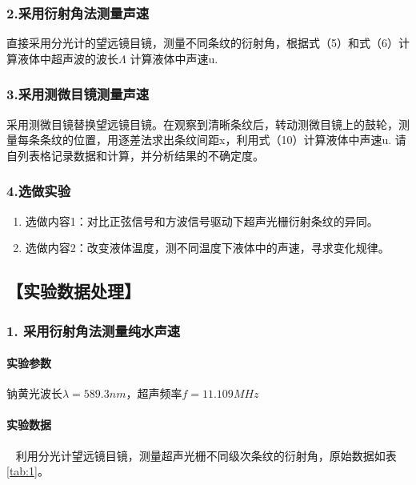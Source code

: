 \documentclass[12pt,a4paper,UTF8]{ctexart}
\begin{document}
\subsubsection*{2.采用衍射角法测量声速}

直接采用分光计的望远镜目镜，测量不同条纹的衍射角，根据式（5）和式（6）计算液体中超声波的波长$\varLambda$ 计算液体中声速u.
\subsubsection*{3.采用测微目镜测量声速}

采用测微目镜替换望远镜目镜。在观察到清晰条纹后，转动测微目镜上的鼓轮，测量每条条纹的位置，用逐差法求出条纹间距x，利用式（10）计算液体中声速u.
请自列表格记录数据和计算，并分析结果的不确定度。

\subsubsection*{4.选做实验}
    \begin{enumerate}
		\item 选做内容1：对比正弦信号和方波信号驱动下超声光栅衍射条纹的异同。
		\item 选做内容2：改变液体温度，测不同温度下液体中的声速，寻求变化规律。		
	\end{enumerate}

\subsection*{【实验数据处理】}

\subsubsection*{1. 采用衍射角法测量纯水声速}
		\paragraph{实验参数} 钠黄光波长$\lambda = 589.3 nm$，超声频率$f = 11.109 MHz$
		\paragraph{实验数据}~
		\newline
		\indent
		利用分光计望远镜目镜，测量超声光栅不同级次条纹的衍射角，原始数据如表\ref{tab:1}。
\end{document}
